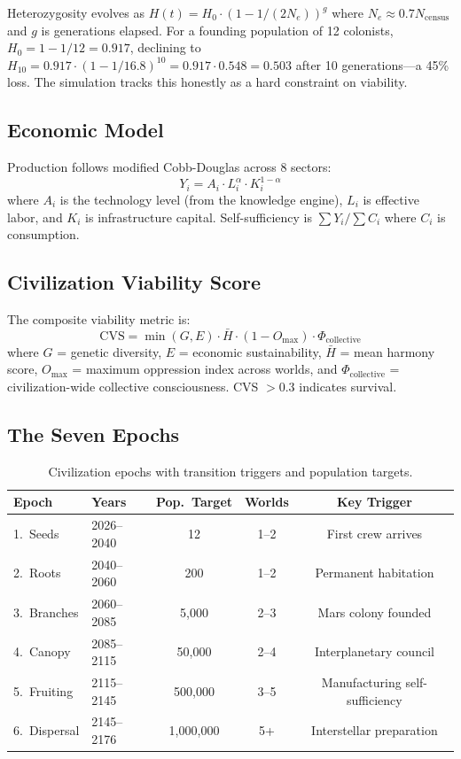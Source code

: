 \documentclass[12pt,a4paper]{article}
\begin{document}
Heterozygosity evolves as $H(t) = H_0 \cdot (1 - 1/(2N_e))^g$ where $N_e \approx 0.7N_\text{census}$ and $g$ is generations elapsed. For a founding population of 12 colonists, $H_0 = 1 - 1/12 = 0.917$, declining to $H_{10} = 0.917 \cdot (1-1/16.8)^{10} = 0.917 \cdot 0.548 = 0.503$ after 10 generations---a 45\% loss. The simulation tracks this honestly as a hard constraint on viability.

\subsection{Economic Model}

Production follows modified Cobb-Douglas across 8 sectors:
\begin{equation}
    Y_i = A_i \cdot L_i^\alpha \cdot K_i^{1-\alpha}
\end{equation}
where $A_i$ is the technology level (from the knowledge engine), $L_i$ is effective labor, and $K_i$ is infrastructure capital. Self-sufficiency is $\sum Y_i / \sum C_i$ where $C_i$ is consumption.

\subsection{Civilization Viability Score}

The composite viability metric is:
\begin{equation}
    \text{CVS} = \min(G, E) \cdot \bar{H} \cdot (1 - O_\text{max}) \cdot \Phi_\text{collective}
\end{equation}
where $G$ = genetic diversity, $E$ = economic sustainability, $\bar{H}$ = mean harmony score, $O_\text{max}$ = maximum oppression index across worlds, and $\Phi_\text{collective}$ = civilization-wide collective consciousness. CVS $> 0.3$ indicates survival.

\subsection{The Seven Epochs}

\begin{table}[h]
\centering
\caption{Civilization epochs with transition triggers and population targets.}
\label{tab:epochs}
\begin{tabular}{@{}llccc@{}}
\toprule
\textbf{Epoch} & \textbf{Years} & \textbf{Pop.\ Target} & \textbf{Worlds} & \textbf{Key Trigger} \\
\midrule
1.\ Seeds      & 2026--2040 & 12        & 1--2 & First crew arrives \\
2.\ Roots      & 2040--2060 & 200       & 1--2 & Permanent habitation \\
3.\ Branches   & 2060--2085 & 5,000     & 2--3 & Mars colony founded \\
4.\ Canopy     & 2085--2115 & 50,000    & 2--4 & Interplanetary council \\
5.\ Fruiting   & 2115--2145 & 500,000   & 3--5 & Manufacturing self-sufficiency \\
6.\ Dispersal  & 2145--2176 & 1,000,000 & 5+   & Interstellar preparation \\
\bottomrule
\end{tabular}
\end{table}
\end{document}
